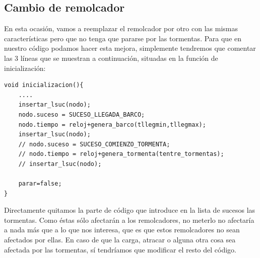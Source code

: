 \documentclass[11pt,a4paper]{report}
\begin{document}
\subsection{Cambio de remolcador}

En esta ocasión, vamos a reemplazar el remolcador por otro con las mismas características pero que no tenga que pararse por las tormentas. Para que en nuestro código
podamos hacer esta mejora, simplemente tendremos que comentar las 3 líneas que se muestran a continuación, situadas en la función de inicialización:
\begin{lstlisting}
void inicializacion(){
	....
	insertar_lsuc(nodo);
	nodo.suceso = SUCESO_LLEGADA_BARCO;
	nodo.tiempo = reloj+genera_barco(tllegmin,tllegmax);
	insertar_lsuc(nodo);
	// nodo.suceso = SUCESO_COMIENZO_TORMENTA;
	// nodo.tiempo = reloj+genera_tormenta(tentre_tormentas);
	// insertar_lsuc(nodo);

	parar=false;
}
\end{lstlisting}

Directamente quitamos la parte de código que introduce en la lista de sucesos las tormentas. Como éstas sólo afectarán a los remolcadores, no meterlo no afectaría a nada
más que a lo que nos interesa, que es que estos remolcadores no sean afectados por ellas. En caso de que la carga, atracar o alguna otra cosa sea afectada por las tormentas,
sí tendríamos que modificar el resto del código.
\end{document}
